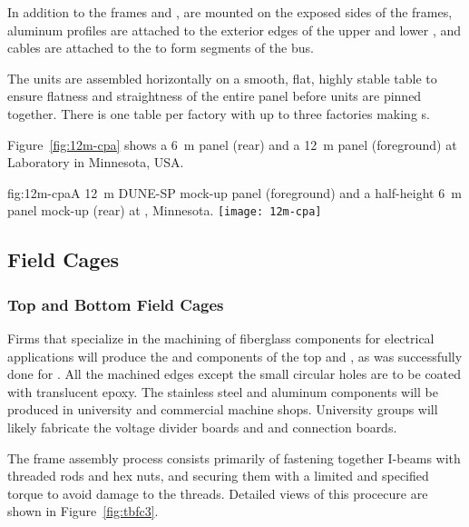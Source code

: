 In addition to the frames and , 
 are mounted on the exposed sides of the \frfour frames, aluminum profiles are attached to the exterior edges of the upper and lower , 
and cables are attached to the  to form segments of the  bus.  

The  units are assembled horizontally on a smooth, flat, highly stable table 
to ensure flatness and straightness of the entire panel before units are pinned together. There is one table per factory with up to three factories making s.

Figure~\ref{fig:12m-cpa} shows a  \SI{6}{\m}   panel (rear) and a \SI{12}{\m}   panel (foreground) at  Laboratory in Minnesota, USA.


\begin{dunefigure}{fig:12m-cpa}{A \SI{12}{\m} DUNE-SP  mock-up panel (foreground) and a %
half-height \SI{6}{\m}  panel mock-up (rear) at , Minnesota.}  %
\texttt{[image: 12m-cpa]}
\end{dunefigure}

\subsection{Field Cages}
\label{sec:fdsp-hv-prod-fc}



\subsubsection{Top and Bottom Field Cages}
\label{sec:fdsp-hv-prod-fc-tb}

Firms that specialize in the machining of fiberglass components for electrical applications will produce the  and \frfour components of the top and , as was successfully done for . 
All the machined edges except the small circular holes are to be coated with translucent epoxy. The stainless steel and aluminum components will be produced in university and commercial machine shops. University groups will likely fabricate the voltage divider boards and  and  connection boards.

The  frame assembly process consists primarily of fastening together  I-beams with  threaded rods and hex nuts,  and securing them with a limited and specified torque to avoid damage to the threads. Detailed views of this procecure %
are shown in Figure~\ref{fig:tbfc3}.

